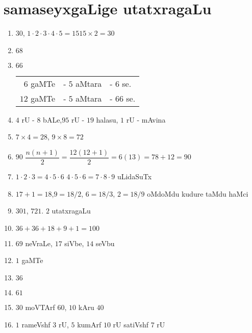 \chapter{samaseyxgaLige utatxragaLu}

\begin{enumerate}
 \renewcommand{\labelenumi}{\rm(\theenumi)}
\item $30$, \qquad $1 \cdot 2 \cdot 3 \cdot 4 \cdot 5 = 15$\qquad  $15 \times 2 =30$

\item $68$

\item $66$ \qquad \begin{tabular}[t]{rrl}
  $6$ gaMTe&  - $5$ aMtara & - $6$ se.\\
  $12$ gaMTe & - $5$ aMtara & - $66$ se.
\end{tabular}

\item $4$ rU - $8$ bALe,\qquad  $95$ rU - $19$ halasu, \qquad  $1$ rU - mAvina

\item $7 \times 4 = 28$, \qquad $9 \times 8 = 72$

\item $90$ \qquad $\dfrac{n(n+1)}{2} = \dfrac{12(12+1)}{2} = 6(13) = 78 +12 = 90$

\item $1 \cdot 2 \cdot  3 = 4 \cdot  5 \cdot 6$ \qquad $4\cdot 5\cdot 6=7\cdot 8\cdot 9$ uLidaSuTx

\item $17+1 =18$,\quad $9 =18/2$, \quad $6=18/3$, \quad $2 = 18/9$ oMdoMdu kudure taMdu haMci

\item $301$, $721$. $2$ utatxragaLu
  
\item $36+36+18+9+1 = 100$

\item $69$ neVraLe, $17$ siVbe, $14$ seVbu

\item $1$ gaMTe

\item $36$

\item $61$

\item $30$ moVTArf $60$, $10$ kAru $40$

\item $1$ rameVshf $3$ rU, $5$ kumArf $10$ rU satiVshf $7$ rU


\end{enumerate}

